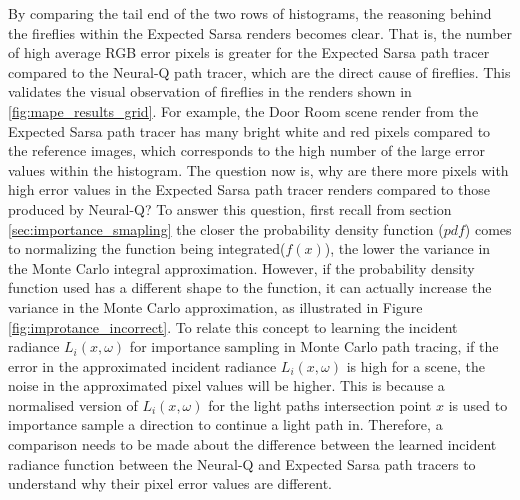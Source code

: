 \documentclass[../dissertation.tex]{subfiles}
\begin{document}
By comparing the tail end of the two rows of histograms, the reasoning behind the fireflies within the Expected Sarsa renders becomes clear. That is, the number of high average RGB error pixels is greater for the Expected Sarsa path tracer compared to the Neural-Q path tracer, which are the direct cause of fireflies. This validates the visual observation of fireflies in the renders shown in \ref{fig:mape_results_grid}. For example, the Door Room scene render from the Expected Sarsa path tracer has many bright white and red pixels compared to the reference images, which corresponds to the high number of the large error values within the histogram. The question now is, why are there more pixels with high error values in the Expected Sarsa path tracer renders compared to those produced by Neural-Q? To answer this question, first recall from section \ref{sec:importance_smapling} the closer the probability density function ($pdf$) comes to normalizing the function being integrated($f(x)$), the lower the variance in the Monte Carlo integral approximation. However, if the probability density function used has a different shape to the function, it can actually increase the variance in the Monte Carlo approximation, as illustrated in Figure \ref{fig:improtance_incorrect}. To relate this concept to learning the incident radiance $L_i(x, \omega)$ for importance sampling in Monte Carlo path tracing, if the error in the approximated incident radiance $L_i(x, \omega)$ is high for a scene, the noise in the approximated pixel values will be higher. This is because a normalised version of $L_i(x, \omega)$ for the light paths intersection point $x$ is used to importance sample a direction to continue a light path in. Therefore, a comparison needs to be made about the difference between the learned incident radiance function between the Neural-Q and Expected Sarsa path tracers to understand why their pixel error values are different.

\end{document}
